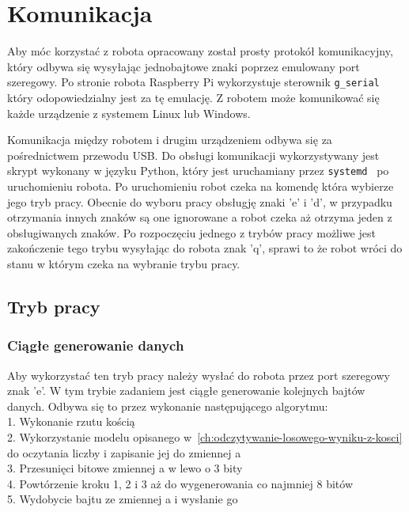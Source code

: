 \chapter{Komunikacja}\label{ch:komunikacja}
Aby móc korzystać z robota opracowany został prosty protokół komunikacyjny, który 
odbywa się wysyłając jednobajtowe znaki poprzez emulowany port szeregowy. Po stronie robota Raspberry Pi wykorzystuje 
sterownik \texttt{g\_serial}~\cite{g_serial} który odopowiedzialny jest za tę emulację. Z robotem może komunikować się 
każde urządzenie z systemem Linux lub Windows. 

Komunikacja między robotem i drugim urządzeniem odbywa się za pośrednictwem przewodu USB.
Do obsługi komunikacji wykorzystywany jest skrypt wykonany w języku Python, który jest uruchamiany 
przez \texttt{systemd}~\cite{systemd} po uruchomieniu robota. Po uruchomieniu robot czeka na komendę która wybierze jego tryb pracy.
Obecnie do wyboru pracy obsługję znaki 'e' i 'd', w przypadku otrzymania innych znaków są one ignorowane a robot czeka aż otrzyma jeden z obsługiwanych znaków.
Po rozpoczęciu jednego z trybów pracy możliwe jest zakończenie tego trybu wysyłając do robota znak 'q', sprawi to że robot wróci do stanu w którym czeka na wybranie 
trybu pracy.


\section{Tryb pracy} \label{sec:tryby}

\subsection{Ciągłe generowanie danych}
Aby wykorzystać ten tryb pracy należy wysłać do robota przez port szeregowy znak 'e'.
W tym trybie zadaniem jest ciągłe generowanie kolejnych bajtów danych.
Odbywa się to przez wykonanie następującego algorytmu:\\
1. Wykonanie rzutu kością \\
2. Wykorzystanie modelu opisanego w~\ref{ch:odczytywanie-losowego-wyniku-z-kosci} do oczytania liczby i zapisanie jej do zmiennej a \\
3. Przesunięci bitowe zmiennej a w lewo o 3 bity \\
4. Powtórzenie kroku 1, 2 i 3 aż do wygenerowania co najmniej 8 bitów \\
5. Wydobycie bajtu ze zmiennej a i wysłanie go \\


